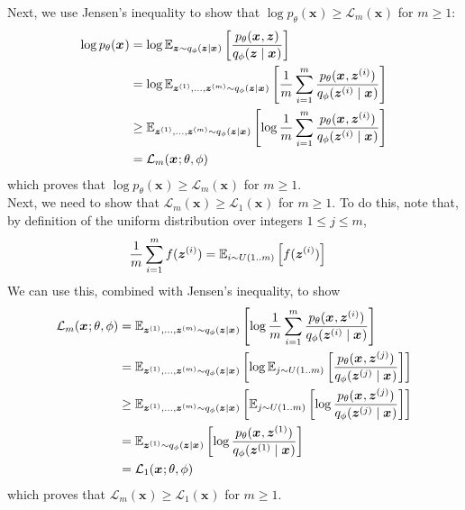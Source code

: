 \documentclass[11pt]{article}
\renewcommand\vec[2][]{\bm{#2}_{#1}}
\newcommand\p{\noindent}
\begin{document}
\p Next, we use Jensen's inequality to show that $\log p_{\theta}(\vec x) \ge \mathcal{L}_m(\vec x)$ for $m \ge 1$:
\begin{align}
	\log p_{\theta}(\vec x)
		&= \log \E[\vec z \sim q_{\phi}(\vec z \mid \vec x)]{
			\frac{ 
			p_{\theta}(\vec x, \vec z)
			}{ 
			q_{\phi}(\vec z \mid \vec x)
			}
		} \\
	&= \log \E[\vec{z}^{(1)}, \ldots, \vec{z}^{(m)} \sim q_{\phi}(\vec z \mid \vec x)]{
		\inv{m} \sum_{i=1}^m
		\frac{ 
			p_{\theta}(\vec x, \ivec[i]{z})
		}{ 
			q_{\phi}(\ivec[i]{z} \mid \vec x)
		}
	} \\
 	&\ge \E[\vec{z}^{(1)}, \ldots, \vec{z}^{(m)} \sim q_{\phi}(\vec z \mid \vec x)]{
 		\log \inv{m} \sum_{i=1}^m \frac{
 			p_{\theta}(\vec x, \vec{z}^{(i)})
 		}{
 			q_{\phi}(\vec{z}^{(i)} \mid \vec x)
 		}
 	} \\
 	&= \mathcal{L}_m(\vec x; \theta, \phi)
\end{align}
which proves that $\log p_{\theta}(\vec x) \ge \mathcal{L}_m(\vec x)$ for $m \ge 1$. \\

\p Next, we need to show that $\mathcal{L}_m(\vec x) \ge \mathcal{L}_1(\vec x)$ for $m \ge 1$. To do this, note that, by definition of the uniform distribution over integers $1 \le j \le m$,
\begin{align}
	\inv{m} \sum_{i=1}^m f(\ivec[i]{z})
		&= \E[i \sim U(1..m)]{f(\ivec[i]{z})}
\end{align}
We can use this, combined with Jensen's inequality, to show
\begin{align}
	\mathcal{L}_m(\vec x; \theta, \phi)
		&=  \E[\vec{z}^{(1)}, \ldots, \vec{z}^{(m)} \sim q_{\phi}(\vec z \mid \vec x)]{
			\log \inv{m} \sum_{i=1}^m \frac{
				p_{\theta}(\vec x, \vec{z}^{(i)})
			}{
				q_{\phi}(\vec{z}^{(i)} \mid \vec x)
			}
		} \\
		&=  \E[\vec{z}^{(1)}, \ldots, \vec{z}^{(m)} \sim q_{\phi}(\vec z \mid \vec x)]{
		\log \E[j \sim U(1..m)]{\frac{
			p_{\theta}(\vec x, \vec{z}^{(j)})
		}{
			q_{\phi}(\vec{z}^{(j)} \mid \vec x)
		}
	} } \\
	&\ge \E[\vec{z}^{(1)}, \ldots, \vec{z}^{(m)} \sim q_{\phi}(\vec z \mid \vec x)]{
	 \E[j \sim U(1..m)]{\log \frac{
				p_{\theta}(\vec x, \vec{z}^{(j)})
			}{
				q_{\phi}(\vec{z}^{(j)} \mid \vec x)
			}
	} } \\
	&= \E[\vec{z}^{(1)} \sim q_{\phi}(\vec z \mid \vec x)]{
	\log \frac{
		p_{\theta}(\vec x, \vec{z}^{(1)})
	}{
		q_{\phi}(\vec{z}^{(1)} \mid \vec x)
	}
} \\
	&= \mathcal{L}_1(\vec x; \theta, \phi)
\end{align}
which proves that $\mathcal{L}_m(\vec x) \ge \mathcal{L}_1(\vec x)$ for $m \ge 1$.
\end{document}
